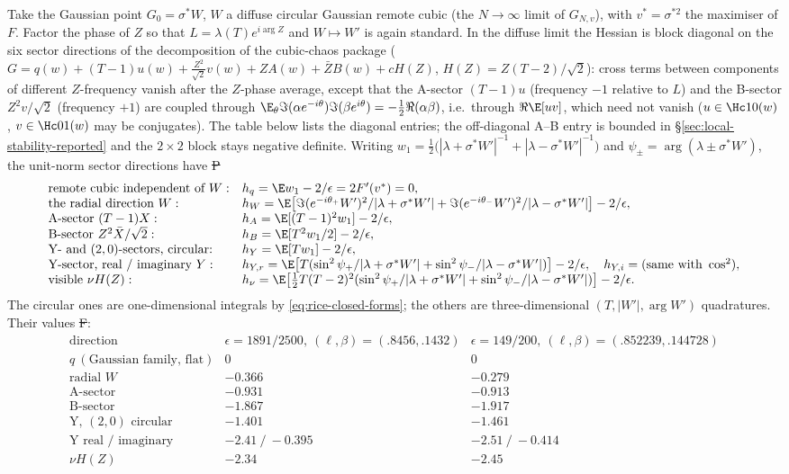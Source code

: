 Take the Gaussian point $G_0=\sigma^*W$, $W$ a diffuse circular
Gaussian remote cubic (the $N\to\infty$ limit of $G_{N,v}$), with
$v^*=\sigma^{*2}$ the maximiser of $F$. Factor the phase of $Z$ so that
$L=\lambda(T)e^{i\arg Z}$ and $W\mapsto W'$ is again standard. In the
diffuse limit the Hessian is block diagonal on the six sector directions
of the decomposition of the cubic-chaos package
($G=q(w)+(T-1)u(w)+\frac{Z^2}{\sqrt2}v(w)+ZA(w)+\bar ZB(w)+cH(Z)$,
$H(Z)=Z(T-2)/\sqrt2$): cross terms between components of different
$Z$-frequency vanish after the $Z$-phase average, except that the
A-sector $(T-1)u$ (frequency $-1$ relative to $L$) and the B-sector
$Z^2v/\sqrt2$ (frequency $+1$) are coupled through
$\E_\theta\Im(\alpha e^{-i\theta})\Im(\beta e^{i\theta})=-\frac12\Re(\alpha\beta)$,
i.e.\ through $\Re\E[uv]$, which need not vanish ($u\in\Hc10(w)$,
$v\in\Hc01(w)$ may be conjugates). The table below lists the diagonal
entries; the off-diagonal A--B entry is bounded in
\S\ref{sec:local-stability-reported} and the $2\times2$ block stays
negative definite. Writing
$w_1=\frac12\big(|\lambda+\sigma^*W'|^{-1}+|\lambda-\sigma^*W'|^{-1}\big)$
and $\psi_\pm=\arg(\lambda\pm\sigma^*W')$, the unit-norm sector
directions have \st{P}
\[
\begin{array}{ll}
 \text{remote cubic independent of }W:& h_q=\E w_1-2/\epsilon=2F'(v^*)=0,\\
 \text{the radial direction }W:&
   h_W=\E\big[\Im(e^{-i\theta_+}W')^2/|\lambda+\sigma^*W'|
            +\Im(e^{-i\theta_-}W')^2/|\lambda-\sigma^*W'|\big]-2/\epsilon,\\
 \text{A-sector }(T-1)X:& h_A=\E[(T-1)^2w_1]-2/\epsilon,\\
 \text{B-sector }Z^2\bar X/\sqrt2:& h_B=\E[T^2w_1/2]-2/\epsilon,\\
 \text{Y- and }(2,0)\text{-sectors, circular:}& h_Y=\E[Tw_1]-2/\epsilon,\\
 \text{Y-sector, real / imaginary }Y:&
   h_{Y,r}=\E\big[T(\sin^2\psi_+/|\lambda+\sigma^*W'|+\sin^2\psi_-/|\lambda-\sigma^*W'|)\big]-2/\epsilon,
   \quad h_{Y,i}=\text{(same with }\cos^2),\\
 \text{visible }\nu H(Z):&
   h_\nu=\E\big[\tfrac12T(T-2)^2(\sin^2\psi_+/|\lambda+\sigma^*W'|+\sin^2\psi_-/|\lambda-\sigma^*W'|)\big]-2/\epsilon .
\end{array}
\]
The circular ones are one-dimensional integrals by
\eqref{eq:rice-closed-forms}; the others are three-dimensional
$(T,|W'|,\arg W')$ quadratures. Their values \st{F}:
\[
\begin{array}{l|c|c}
 \text{direction}&\epsilon=1891/2500,\ (\ell,\beta)=(.8456,.1432)
 &\epsilon=149/200,\ (\ell,\beta)=(.852239,.144728)\\\hline
 q\ (\text{Gaussian family, flat})&0&0\\
 \text{radial }W&-0.366&-0.279\\
 \text{A-sector}&-0.931&-0.913\\
 \text{B-sector}&-1.867&-1.917\\
 \text{Y, }(2,0)\text{ circular}&-1.401&-1.461\\
 \text{Y real / imaginary}&-2.41\ /\ -0.395&-2.51\ /\ -0.414\\
 \nu H(Z)&-2.34&-2.45
\end{array}
\]
